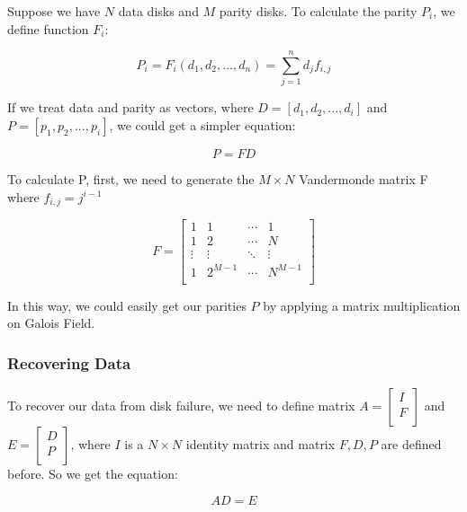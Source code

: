 \documentclass[journal]{IEEEtran}
\begin{document}
Suppose we have $N$ data disks and $M$ parity disks. To calculate the parity $P_i$, we define function $F_i$: 

\begin{equation}
P_i = F_i(d_1,d_2,...,d_n) = \sum_{j=1}^{n}d_j f_{i,j}
\end{equation}

If we treat data and parity as vectors, where $D = [d_1, d_2, ... , d_i]$ and $P = [p_1, p_2, ... ,p_i]$, we could get a simpler equation:

\begin{equation}
P=FD
\end{equation}

To calculate P, first, we need to generate the $M \times N$ Vandermonde matrix F where $f_{i,j} = j ^ {i-1}$

\begin{equation}
F =
\left[
\begin{matrix}
1      & 1      & \cdots & 1      \\
1      & 2      & \cdots & N      \\
\vdots & \vdots & \ddots & \vdots \\
1      & 2^{M-1}      & \cdots & N^{M-1}      \\
\end{matrix}
\right]
\end{equation}

In this way, we could easily get our parities $P$ by applying a matrix multiplication on Galois Field.

\subsubsection{Recovering Data}

To recover our data from disk failure, we need to define matrix $A = \left[\begin{matrix}I \\F \\\end{matrix}\right]$ and $E= \left[\begin{matrix}D \\P \\\end{matrix}\right]$, where $I$ is a $N \times N$ identity matrix and matrix $F, D, P$ are defined before. So we get the equation:

\begin{equation}
AD=E
\end{equation}
\end{document}
